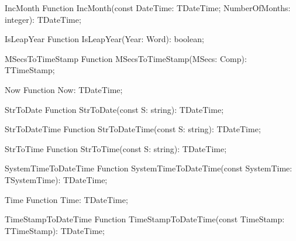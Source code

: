  
\begin{function}{IncMonth}
\Declaration
Function IncMonth(const DateTime: TDateTime; NumberOfMonths: integer): TDateTime;
\Description
\Errors
\SeeAlso
\end{function}

 
\begin{function}{IsLeapYear}
\Declaration
Function IsLeapYear(Year: Word): boolean;
\Description
\Errors
\SeeAlso
\end{function}

 
\begin{function}{MSecsToTimeStamp}
\Declaration
Function MSecsToTimeStamp(MSecs: Comp): TTimeStamp;
\Description
\Errors
\SeeAlso
\end{function}

 
\begin{function}{Now}
\Declaration
Function Now: TDateTime;
\Description
\Errors
\SeeAlso
\end{function}

 
\begin{function}{StrToDate}
\Declaration
Function StrToDate(const S: string): TDateTime;
\Description
\Errors
\SeeAlso
\end{function}

 
\begin{function}{StrToDateTime}
\Declaration
Function StrToDateTime(const S: string): TDateTime;
\Description
\Errors
\SeeAlso
\end{function}

 
\begin{function}{StrToTime}
\Declaration
Function StrToTime(const S: string): TDateTime;
\Description
\Errors
\SeeAlso
\end{function}

 
\begin{function}{SystemTimeToDateTime}
\Declaration
Function SystemTimeToDateTime(const SystemTime: TSystemTime): TDateTime;
\Description
\Errors
\SeeAlso
\end{function}

 
\begin{function}{Time}
\Declaration
Function Time: TDateTime;
\Description
\Errors
\SeeAlso
\end{function}

 
\begin{function}{TimeStampToDateTime}
\Declaration
Function TimeStampToDateTime(const TimeStamp: TTimeStamp): TDateTime;
\Description
\Errors
\SeeAlso
\end{function}

